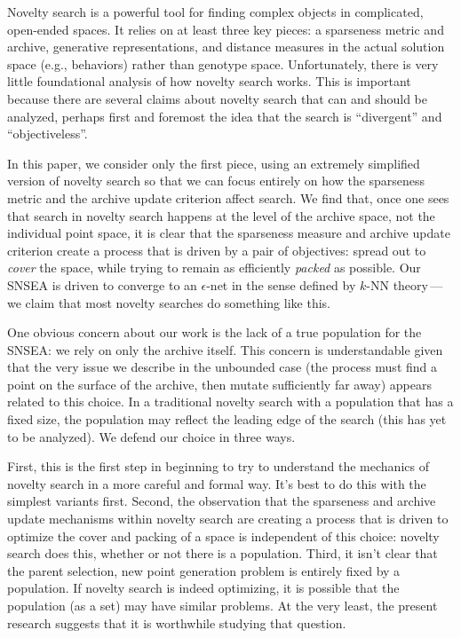 \documentclass[twoside]{article}
\begin{document}
Novelty search is a powerful tool for finding complex objects in complicated, open-ended spaces.  It relies on at least three key pieces:  a sparseness metric and archive, generative representations, and distance measures in the actual solution space (e.g., behaviors) rather than genotype space.  Unfortunately, there is very little foundational analysis of how novelty search works.  This is important because there are several claims about novelty search that can and should be analyzed, perhaps first and foremost the idea that the search is ``divergent'' and ``objectiveless''.  

In this paper, we consider only the first piece, using an extremely simplified version of novelty search so that we can focus entirely on how the sparseness metric and the archive update criterion affect search.  We find that, once one sees that search in novelty search happens at the level of the archive space, not the individual point space, it is clear that the sparseness measure and archive update criterion create a process that is driven by a pair of objectives:  spread out to \emph{cover} the space, while trying to remain as efficiently \emph{packed} as possible.  Our SNSEA is driven to converge to an $\epsilon$-net in the sense defined by $k$-NN theory\,---\,we claim that most novelty searches do something like this.

One obvious concern about our work is the lack of a true population for the SNSEA: we rely on only the archive itself.  This concern is understandable given that the very issue we describe in the unbounded case (the process must find a point on the surface of the archive, then mutate sufficiently far away) appears related to this choice.  In a traditional novelty search with a population that has a fixed size, the population may reflect the leading edge of the search (this has yet to be analyzed).  We defend our choice in three ways.

First, this is the first step in beginning to try to understand the mechanics of novelty search in a more careful and formal way.  It's best to do this with the simplest variants first.  Second, the observation that the sparseness and archive update mechanisms within novelty search are creating a process that is driven to optimize the cover and packing of a space is independent of this choice:  novelty search does this, whether or not there is a population.  Third, it isn't clear that the parent selection, new point generation problem is entirely fixed by a population.  If novelty search is indeed optimizing, it is possible that the population (as a set) may have similar problems.  At the very least, the present research suggests that it is worthwhile studying that question.
\end{document}
